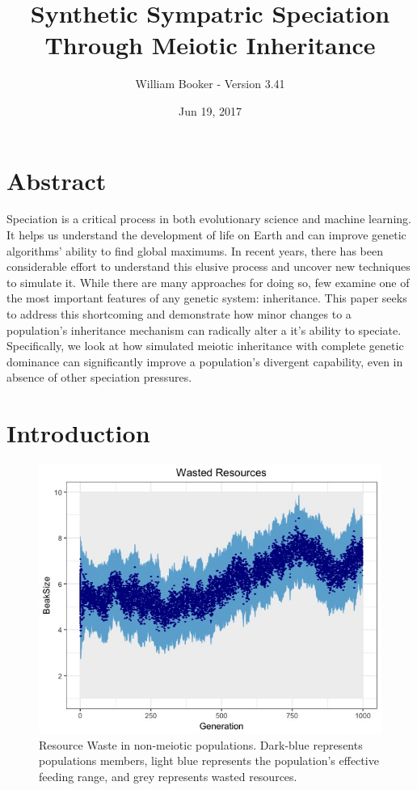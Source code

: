 \documentclass{article}
\title{Synthetic Sympatric Speciation Through Meiotic Inheritance}
\author{William Booker - Version 3.41}
\date{Jun 19, 2017}
\newcommand\TODO[1]{\textcolor{red}{#1}}
\begin{document}
\captionsetup{justification=centering}

\maketitle


\section{Abstract}

Speciation is a critical process in both evolutionary science and machine learning. It helps us understand the development of life on Earth and can improve genetic algorithms' ability to find global maximums. In recent years, there has been considerable effort to understand this elusive process and uncover new techniques to simulate it. While there are many approaches for doing so, few examine one of the most important features of any genetic system: inheritance. This paper seeks to address this shortcoming and demonstrate how minor changes to a population's inheritance mechanism can radically alter a it's ability to speciate. Specifically, we look at how simulated meiotic inheritance with complete genetic dominance can significantly improve a population's divergent capability, even in absence of other speciation pressures. 

\section{Introduction}

\begin{figure}[t]
    \centering
    \includegraphics[width=\linewidth]{Data/FrontPage}
    \caption{Resource Waste in non-meiotic populations. Dark-blue represents populations members, light blue represents the population's effective feeding range, and grey represents wasted resources.}
    \label{fig:FrontPage}
\end{figure}
\end{document}
